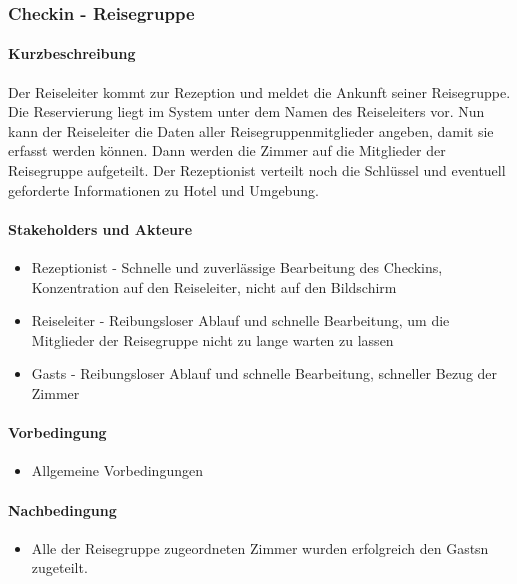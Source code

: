 \subsubsection{Checkin - Reisegruppe}

\paragraph{Kurzbeschreibung}
Der \Gls{Reiseleiter} kommt zur \Gls{Rezeption} und meldet die Ankunft seiner Reisegruppe. Die \Gls{Reservierung} liegt im System unter dem Namen des \Gls{Reiseleiter}s vor. Nun kann der \Gls{Reiseleiter} die Daten aller Reisegruppenmitglieder angeben, damit sie erfasst werden können.
Dann werden die Zimmer auf die Mitglieder der Reisegruppe aufgeteilt. Der Rezeptionist verteilt noch die Schlüssel und eventuell geforderte Informationen zu Hotel und Umgebung.

\paragraph{Stakeholders und Akteure}
\begin{itemize}
	\item \Gls{Rezeptionist} - Schnelle und zuverlässige Bearbeitung des \Gls{Checkin}s, Konzentration auf den  \Gls{Reiseleiter}, nicht auf den Bildschirm
	\item \Gls{Reiseleiter} - Reibungsloser Ablauf und schnelle Bearbeitung, um die Mitglieder der Reisegruppe nicht zu lange warten zu lassen
	\item \Glspl{Gast} - Reibungsloser Ablauf und schnelle Bearbeitung, schneller Bezug der \Gls{Zimmer}
\end{itemize}

\paragraph{Vorbedingung}
\begin{itemize}
	\item Allgemeine Vorbedingungen
\end{itemize}

\paragraph{Nachbedingung}
\begin{itemize}
	\item Alle der Reisegruppe zugeordneten \Gls{Zimmer} wurden erfolgreich den \Glspl{Gast}n zugeteilt.
\end{itemize}

